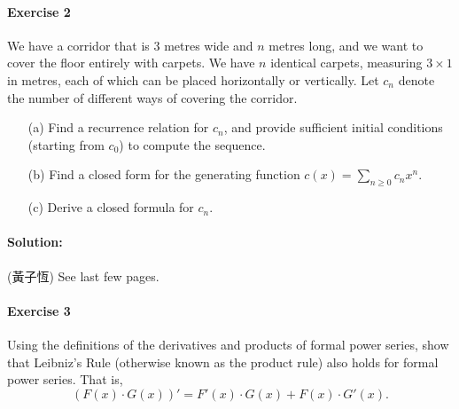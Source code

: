 \documentclass[a4paper,12pt]{article}
\begin{document}
\paragraph{Exercise 2}  We have a corridor that is $3$ metres wide and $n$ metres long, and we want to cover the floor entirely with carpets. We have $n$ identical carpets, measuring $3 \times 1$ in metres, each of which can be placed horizontally or vertically. Let $c_n$ denote the number of different ways of covering the corridor.

\begin{itemize}
	\item[(a)] Find a recurrence relation for $c_n$, and provide sufficient initial conditions (starting from $c_0$) to compute the sequence.
	\item[(b)] Find a closed form for the generating function $c(x) = \sum_{n \ge 0} c_n x^n$.
	\item[(c)] Derive a closed formula for $c_n$.
\end{itemize}

\paragraph{Solution:} (黃子恆) See last few pages.

\paragraph{Exercise 3}   Using the definitions of the derivatives and products of formal power series, show that Leibniz's Rule (otherwise known as the product rule) also holds for formal power series.  That is,
\[ \left( F(x) \cdot G(x) \right)' = F'(x) \cdot G(x) + F(x) \cdot G'(x). \]
\end{document}
